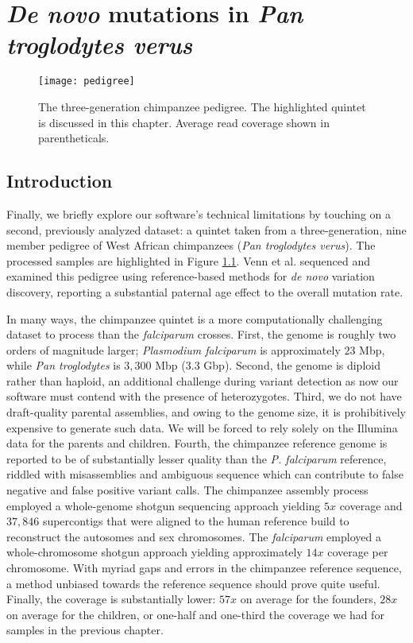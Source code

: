 \chapter{\textit{De novo} mutations in \textit{Pan troglodytes verus}}
\label{ch:chimp}

\begin{figure}[h!]
  \centering
    \texttt{[image: pedigree]}
  \caption{The three-generation chimpanzee pedigree.  The highlighted quintet is discussed in this chapter.  Average read coverage shown in parentheticals.}
  \label{fig:pedigree}
\end{figure}

\section{Introduction}

Finally, we briefly explore our software's technical limitations by touching on a second, previously analyzed dataset: a quintet taken from a three-generation, nine member pedigree of West African chimpanzees (\textit{Pan troglodytes verus}).  The processed samples are highlighted in Figure \ref{fig:pedigree}.  Venn {et al.} sequenced and examined this pedigree using reference-based methods for \textit{de novo} variation discovery, reporting a substantial paternal age effect to the overall mutation rate\cite{Venn:2014ep}.

In many ways, the chimpanzee quintet is a more computationally challenging dataset to process than the \textit{falciparum} crosses.  First, the genome is roughly two orders of magnitude larger; \textit{Plasmodium falciparum} is approximately $23$ Mbp, while \textit{Pan troglodytes} is $3,300$ Mbp ($3.3$ Gbp).  Second, the genome is diploid rather than haploid, an additional challenge during variant detection as now our software must contend with the presence of heterozygotes.  Third, we do not have draft-quality parental assemblies, and owing to the genome size, it is prohibitively expensive to generate such data.  We will be forced to rely solely on the Illumina data for the parents and children.  Fourth, the chimpanzee reference genome is reported to be of substantially lesser quality than the \textit{P. falciparum} reference, riddled with misassemblies and ambiguous sequence which can contribute to false negative and false positive variant calls\cite{Mallick:2009go}.  The chimpanzee assembly process employed a whole-genome shotgun sequencing approach yielding $5x$ coverage and $37,846$ supercontigs that were aligned to the human reference build to reconstruct the autosomes and sex chromosomes\cite{ChimpanzeeSequencingandAnalysisConsortium:2005fa}.  The \textit{falciparum} employed a whole-chromosome shotgun approach yielding approximately $14x$ coverage per chromosome.  With myriad gaps and errors in the chimpanzee reference sequence, a method unbiased towards the reference sequence should prove quite useful.  Finally, the coverage is substantially lower: $57x$ on average for the founders, $28x$ on average for the children, or one-half and one-third the coverage we had for samples in the previous chapter.

